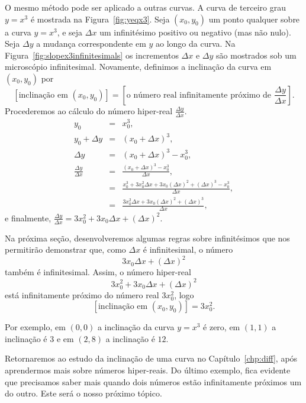 O mesmo método pode ser aplicado a outras curvas. A curva de
terceiro grau $y = x^3$ é mostrada na Figura~\ref{fig:yeqx3}.
Seja $(x_0, y_0)$ um ponto qualquer sobre a curva $y = x^3$,
e seja $\Delta x$ um infinitésimo positivo ou negativo (mas
não nulo). Seja $\Delta y$ a mudança correspondente em $y$ ao
longo da curva. Na Figura~\ref{fig:slopex3infinitesimals} os
incrementos $\Delta x$ e $\Delta y$ são mostrados sob um
microscópio infinitesimal. Novamente, definimos a inclinação da
curva em $(x_0, y_0)$ por
\[
  [\text{inclinação em } (x_0, y_0)] =
  \left[ \text{o número real infinitamente próximo de } \frac{\Delta y}{\Delta x} \right].
\]
Procederemos ao cálculo do número hiper-real
$\displaystyle \frac{\Delta y}{\Delta x}.$
\begin{eqnarray*}
             y_0 & = & x_0^3, \\
  y_0 + \Delta y & = & (x_0 + \Delta x)^3, \\
        \Delta y & = & (x_0 + \Delta x)^3 - x_0^3, \\
  \frac{\Delta y}{\Delta x}
                 & = & \frac{(x_0 + \Delta x)^3 - x_0^3}
                            {\Delta x}, \\
                 & = & \frac{x_0^3 + 3 x_0^2 \Delta x + 3x_0(\Delta x)^2
                             + (\Delta x)^3 - x_0^3}
                            {\Delta x}, \\
                 & = & \frac{3 x_0^2 \Delta x + 3x_0(\Delta x)^2
                             + (\Delta x)^3}
                            {\Delta x},
\end{eqnarray*}
e finalmente, \SPC $\displaystyle \frac{\Delta y}{\Delta x} =
3x_0^2 + 3x_0 \Delta x + (\Delta x)^2.$

Na próxima seção, desenvolveremos algumas regras sobre
infinitésimos que nos permitirão demonstrar que, como
$\Delta x$ é infinitesimal, o número
\[
  3x_0\Delta x + (\Delta x)^2
\]
também é infinitesimal. Assim, o número hiper-real
\[
  3 x_0^2 + 3 x_0 \Delta x + (\Delta x)^2
\]
está infinitamente próximo do número real $3x_0^2$, logo
\[
  [\text{inclinação em } (x_0, y_0)] = 3 x_0^2.
\]

Por exemplo, em $(0, 0)$ a inclinação da curva $y = x^3$ é
zero, em $(1, 1)$ a inclinação é $3$ e em $(2, 8)$ a inclinação
é $12$.

Retornaremos ao estudo da inclinação de uma curva no
Capítulo~\ref{chp:diff}, após aprendermos mais sobre
números hiper-reais. Do último exemplo, fica evidente que
precisamos saber mais quando dois números estão infinitamente
próximos um do outro. Este será o nosso próximo tópico.

